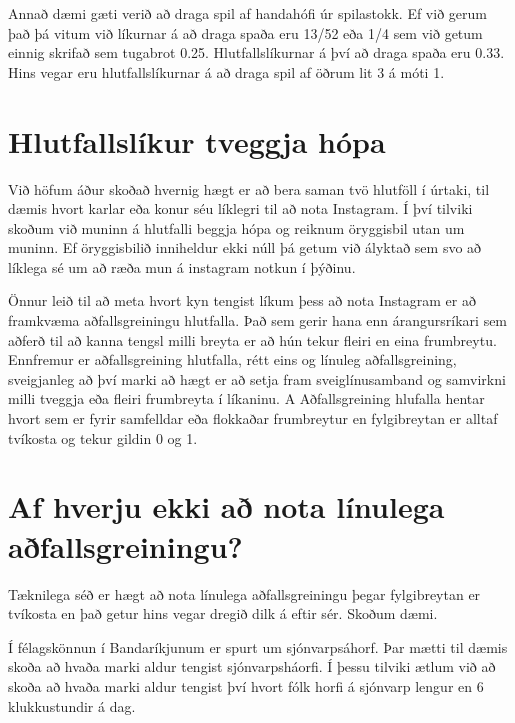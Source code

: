 \documentclass[]{book}
\begin{document}
Annað dæmi gæti verið að draga spil af handahófi úr spilastokk. Ef við gerum það þá vitum við líkurnar á að draga spaða eru 13/52 eða 1/4 sem við getum einnig skrifað sem tugabrot 0.25. Hlutfallslíkurnar á því að draga spaða eru 0.33. Hins vegar eru hlutfallslíkurnar á að draga spil af öðrum lit 3 á móti 1.

\hypertarget{hlutfallsluxedkur-tveggja-huxf3pa}{%
\section{Hlutfallslíkur tveggja hópa}\label{hlutfallsluxedkur-tveggja-huxf3pa}}

Við höfum áður skoðað hvernig hægt er að bera saman tvö hlutföll í úrtaki, til dæmis hvort karlar eða konur séu líklegri til að nota Instagram. Í því tilviki skoðum við muninn á hlutfalli beggja hópa og reiknum öryggisbil utan um muninn. Ef öryggisbilið inniheldur ekki núll þá getum við ályktað sem svo að líklega sé um að ræða mun á instagram notkun í þýðinu.

Önnur leið til að meta hvort kyn tengist líkum þess að nota Instagram er að framkvæma aðfallsgreiningu hlutfalla. Það sem gerir hana enn árangursríkari sem aðferð til að kanna tengsl milli breyta er að hún tekur fleiri en eina frumbreytu. Ennfremur er aðfallsgreining hlutfalla, rétt eins og línuleg aðfallsgreining, sveigjanleg að því marki að hægt er að setja fram sveiglínusamband og samvirkni milli tveggja eða fleiri frumbreyta í líkaninu. A Aðfallsgreining hlufalla hentar hvort sem er fyrir samfelldar eða flokkaðar frumbreytur en fylgibreytan er alltaf tvíkosta og tekur gildin 0 og 1.

\hypertarget{af-hverju-ekki-auxf0-nota-luxednulega-auxf0fallsgreiningu}{%
\section{Af hverju ekki að nota línulega aðfallsgreiningu?}\label{af-hverju-ekki-auxf0-nota-luxednulega-auxf0fallsgreiningu}}

Tæknilega séð er hægt að nota línulega aðfallsgreiningu þegar fylgibreytan er tvíkosta en það getur hins vegar dregið dilk á eftir sér. Skoðum dæmi.

Í félagskönnun í Bandaríkjunum er spurt um sjónvarpsáhorf. Þar mætti til dæmis skoða að hvaða marki aldur tengist sjónvarpsháorfi. Í þessu tilviki ætlum við að skoða að hvaða marki aldur tengist því hvort fólk horfi á sjónvarp lengur en 6 klukkustundir á dag.
\end{document}
